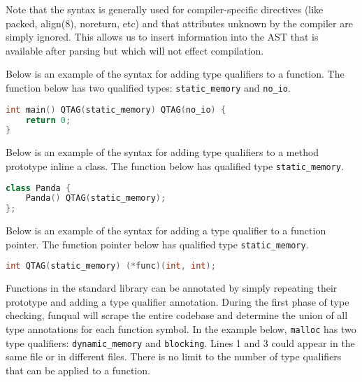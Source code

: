 Note that the  syntax is generally used for compiler-specific directives (like packed, align(8), noreturn, etc) and that attributes unknown by the compiler are simply ignored.  This allows us to insert information into the AST that is available after parsing but which will not effect compilation.

Below is an example of the syntax for adding type qualifiers to a function.  The function below has two qualified types: \lstinline{static_memory} and \lstinline{no_io}.

\noindent\begin{minipage}[t]{\linewidth}
\begin{lstlisting}[language=C]
int main() QTAG(static_memory) QTAG(no_io) {
    return 0;
}
\end{lstlisting}
\end{minipage}

Below is an example of the syntax for adding type qualifiers to a method prototype inline a class.  The function below has qualified type \lstinline{static_memory}.

\noindent\begin{minipage}[t]{\linewidth}
\begin{lstlisting}[language=C++]
class Panda {
    Panda() QTAG(static_memory);
};
\end{lstlisting}
\end{minipage}

Below is an example of the syntax for adding a type qualifier to a function pointer.  The function pointer below has qualified type \lstinline{static_memory}.

\noindent\begin{minipage}[t]{\linewidth}
\begin{lstlisting}[language=C++]
int QTAG(static_memory) (*func)(int, int);
\end{lstlisting}
\end{minipage}

Functions in the standard library can be annotated by simply repeating their prototype and adding a type qualifier annotation.  During the first phase of type checking, funqual will scrape the entire codebase and determine the union of all type annotations for each function symbol.  In the example below, \lstinline{malloc} has two type qualifiers:  \lstinline{dynamic_memory} and \lstinline{blocking}.  Lines 1 and 3 could appear in the same file or in different files.  There is no limit to the number of type qualifiers that can be applied to a function.

